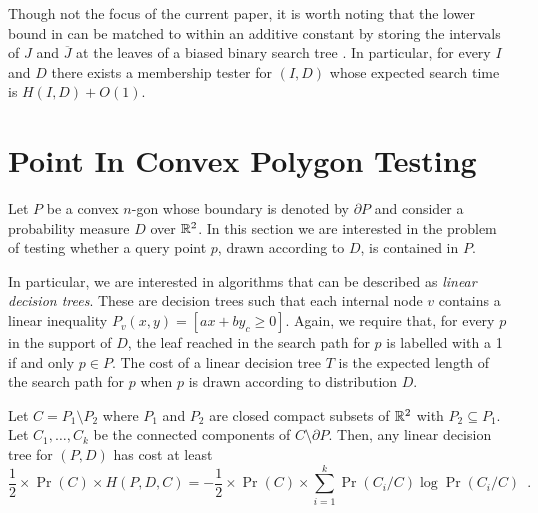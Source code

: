 \documentclass[charterfonts,lotsofwhite]{patmorin}
\begin{document}
Though not the focus of the current paper, it is worth noting that the
lower bound in  can be matched to within an additive
constant by storing the intervals of $J$ and $\overline{J}$ at the
leaves of a biased binary search tree \cite{kXX,mXX}.  In particular,
for every $I$ and $D$ there exists a membership tester for $(I,D)$
whose expected search time is $H(I,D)+O(1)$.

\section{Point In Convex Polygon Testing}

Let $P$ be a convex $n$-gon whose boundary is denoted by $\partial P$
and consider a probability measure $D$ over $\mathbb{R}^2$.  In this section
we are interested in the problem of testing whether a query point $p$,
drawn according to $D$, is contained in $P$.   

In particular, we are interested in algorithms that can be described
as \emph{linear decision trees}.  These are decision trees such that
each internal node $v$ contains a linear inequality $P_v(x,y)=[ax+by_c
\ge 0]$.  Again, we require that, for every $p$ in the support of $D$,
the leaf reached in the search path for $p$ is labelled with a 1 if
and only $p\in P$.  The cost of a linear decision tree $T$ is the
expected length of the search path for $p$ when $p$ is drawn according
to distribution $D$.

\begin{lem}
Let $C=P_1\setminus P_2$ where $P_1$ and $P_2$ are closed compact
subsets of $\mathbb{R}^2$ with $P_2\subseteq P_1$.  Let $C_1,\ldots,C_k$ be
the connected components of $C\setminus\partial P$.  Then, any linear
decision tree for $(P,D)$ has cost at least
\[
	\frac{1}{2}\times \Pr(C)\times H(P,D,C) 
		= -\frac{1}{2}\times\Pr(C)\times 
			\sum_{i=1}^k \Pr(C_i/C)\log \Pr(C_i/C)
		\enspace .
\]
\end{lem}
\end{document}
